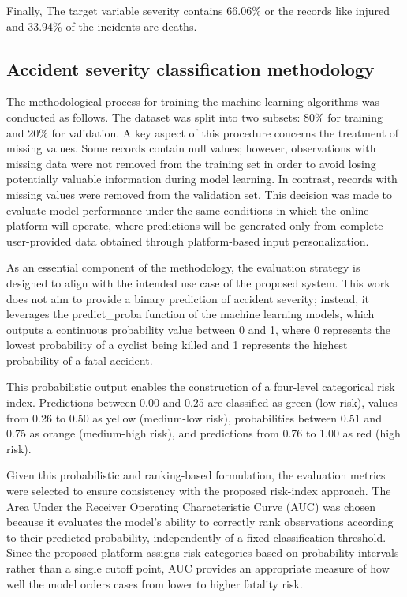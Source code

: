 \documentclass[preprint,12pt]{elsarticle}
\begin{document}
Finally, The target variable severity contains 66.06\% or the records like injured and 33.94\% of the incidents are deaths.



\subsection{Accident severity classification methodology}

The methodological process for training the machine learning algorithms was conducted as follows. The dataset was split into two subsets: 80\% for training and 20\% for validation. A key aspect of this procedure concerns the treatment of missing values. Some records contain null values; however, observations with missing data were not removed from the training set in order to avoid losing potentially valuable information during model learning. In contrast, records with missing values were removed from the validation set. This decision was made to evaluate model performance under the same conditions in which the online platform will operate, where predictions will be generated only from complete user-provided data obtained through platform-based input personalization. 

As an essential component of the methodology, the evaluation strategy is designed to align with the intended use case of the proposed system. This work does not aim to provide a binary prediction of accident severity; instead, it leverages the predict\_proba function of the machine learning models, which outputs a continuous probability value between 0 and 1, where 0 represents the lowest probability of a cyclist being killed and 1 represents the highest probability of a fatal accident.

This probabilistic output enables the construction of a four-level categorical risk index. Predictions between 0.00 and 0.25 are classified as green (low risk), values from 0.26 to 0.50 as yellow (medium-low risk), probabilities between 0.51 and 0.75 as orange (medium-high risk), and predictions from 0.76 to 1.00 as red (high risk).

Given this probabilistic and ranking-based formulation, the evaluation metrics were selected to ensure consistency with the proposed risk-index approach. The Area Under the Receiver Operating Characteristic Curve (AUC) was chosen because it evaluates the model’s ability to correctly rank observations according to their predicted probability, independently of a fixed classification threshold. Since the proposed platform assigns risk categories based on probability intervals rather than a single cutoff point, AUC provides an appropriate measure of how well the model orders cases from lower to higher fatality risk.
\end{document}

